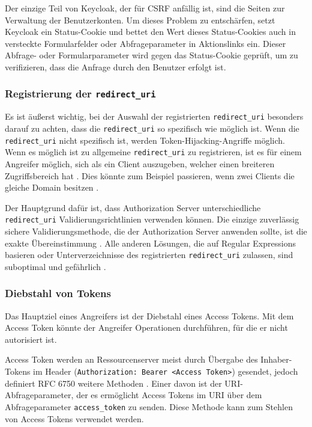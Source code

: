 Der einzige Teil von Keycloak, der für CSRF anfällig ist, sind die Seiten zur Verwaltung der Benutzerkonten. Um dieses Problem zu entschärfen, setzt Keycloak ein Status-Cookie und bettet den Wert dieses Status-Cookies auch in versteckte Formularfelder oder Abfrageparameter in Aktionslinks ein. Dieser Abfrage- oder Formularparameter wird gegen das Status-Cookie geprüft, um zu verifizieren, dass die Anfrage durch den Benutzer erfolgt ist. \cite{SSEB_keycloakDocs}

\subsubsection{Registrierung der \texttt{redirect\_uri}}\label{Registrierung_redirect_uri}

Es ist äußerst wichtig, bei der Auswahl der registrierten \texttt{redirect\_uri} besonders darauf zu achten, dass die \texttt{redirect\_uri} so spezifisch wie möglich ist. Wenn die \texttt{redirect\_uri} nicht spezifisch ist, werden Token-Hijacking-Angriffe möglich. Wenn es möglich ist zu allgemeine \texttt{redirect\_uri} zu registrieren, ist es für einem Angreifer möglich, sich als ein Client auszugeben, welcher einen breiteren Zugriffsbereich hat \cite{SSEB_keycloakDocs}. Dies könnte zum Beispiel passieren, wenn zwei Clients die gleiche Domain besitzen \cite{SSEB_keycloakDocs}.

Der Hauptgrund dafür ist, dass Authorization Server unterschiedliche \texttt{redirect\_uri} Validierungsrichtlinien verwenden können. Die einzige zuverlässig sichere Validierungsmethode, die der Authorization Server anwenden sollte, ist die exakte Übereinstimmung \cite{SSEB_OAuth2inAction}. Alle anderen Lösungen, die auf Regular Expressions basieren oder Unterverzeichnisse des registrierten \texttt{redirect\_uri} zulassen, sind suboptimal und gefährlich \cite{SSEB_OAuth2inAction}.


\subsubsection{Diebstahl von Tokens}

Das Hauptziel eines Angreifers ist der Diebstahl eines Access Tokens. Mit dem Access Token könnte der Angreifer Operationen durchführen, für die er nicht autorisiert ist. 

Access Token werden an Ressourcenserver meist durch Übergabe des Inhaber-Tokens im Header (\texttt{Authorization: Bearer <Access Token>}) gesendet, jedoch definiert RFC 6750 weitere Methoden \cite{SSEB_RFC6750}. Einer davon ist der URI-Abfrageparameter, der es ermöglicht Access Tokens im URI über dem Abfrageparameter \texttt{access\_token} zu senden. Diese Methode kann zum Stehlen von Access Tokens verwendet werden. 

